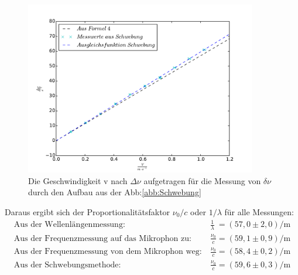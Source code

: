\begin{figure}
\centering
\includegraphics[width=0.9\textwidth]{graph2.pdf}
\caption{Die Geschwindigkeit v nach $\Delta\nu $ aufgetragen für die Messung von $\delta\nu$ durch den Aufbau aus der Abb:\ref{abb:Schwebung}}
\label{abb:schw}
\end{figure}
\FloatBarrier
Daraus ergibt sich der Proportionalitätsfaktor $\nu_0/c$ oder $1/\lambda$ für alle Messungen:
\begin{align}
   \text{Aus der Wellenlängenmessung:} \ &
   \frac{1}{\lambda} \ =(57,0\pm2,0)\si{\per\meter}\\
   \text{Aus der Frequenzmessung auf das Mikrophon zu:} \ &
   \frac{\nu_0}{c}=(59,1\pm0,9)\si{\per\meter}\\
\text{Aus der Frequenzmessung von dem Mikrophon weg:} \ &
\frac{\nu_0}{c}=(58,4\pm0,2)\si{\per\meter}\\
\text{Aus der Schwebungsmethode:} \ &
\frac{\nu_0}{c}=(59,6\pm0,3)\si{\per\meter}
\end{align}
